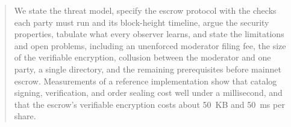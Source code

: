 \begin{abstract}
We state the threat model, specify the escrow protocol with the checks each party must run and its block-height timeline, argue the security properties, tabulate what every observer learns, and state the limitations and open problems, including an unenforced moderator filing fee, the size of the verifiable encryption, collusion between the moderator and one party, a single directory, and the remaining prerequisites before mainnet escrow. Measurements of a reference implementation show that catalog signing, verification, and order sealing cost well under a millisecond, and that the escrow's verifiable encryption costs about 50~KB and 50~ms per share.
\end{abstract}
